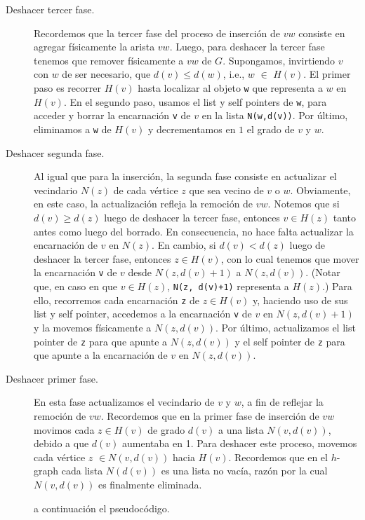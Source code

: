 \documentclass[%
    a4paper,%
    12pt,%
    twoside,%
    openright,%
    halfparskip,%
    cleardoubleempty,%
    bigheadings,%
    titlepage,%
    headsepline%
]{scrbook}
\makeatletter
\newcommand{\Code}[1]{\lstinline[basicstyle={\tt}]@#1@}
\makeatother
\begin{document}
\begin{description}
\item[Deshacer tercer fase.] Recordemos que la tercer fase del proceso de inserción de $vw$ consiste en agregar físicamente la arista $vw$.  Luego, para deshacer la tercer fase tenemos que remover físicamente a $vw$ de $G$.  Supongamos, invirtiendo $v$ con $w$ de ser necesario, que $d(v) \leq d(w)$, i.e., $w$ ${\in}$ $H(v)$.  El primer paso es recorrer $H(v)$ hasta localizar al objeto \texttt{w} que representa a $w$ en $H(v)$.  En el segundo paso, usamos el list y self pointers de \texttt{w}, para acceder y borrar la encarnación \texttt{v} de $v$ en la lista \Code{N(w,d(v))}.  Por último, eliminamos a \texttt{w} de $H(v)$ y decrementamos en $1$ el grado de $v$ y $w$.

\item[Deshacer segunda fase.] Al igual que para la inserción, la segunda fase consiste en actualizar el vecindario $N(z)$ de cada vértice $z$ que sea vecino de $v$ o $w$.  Obviamente, en este caso, la actualización refleja la remoción de $vw$.  Notemos que si $d(v) \geq d(z)$ luego de deshacer la tercer fase, entonces $v \in H(z)$ tanto antes como luego del borrado.  En consecuencia, no hace falta actualizar la encarnación de $v$ en $N(z)$.  En cambio, si $d(v) < d(z)$ luego de deshacer la tercer fase, entonces $z \in H(v)$, con lo cual tenemos que mover la encarnación \Code{v} de $v$ desde $N(z,d(v)+1)$ a $N(z, d(v))$.  (Notar que, en caso en que $v \in H(z)$, \Code{N(z, d(v)+1)} representa a $H(z)$.)  Para ello, recorremos cada encarnación \Code{z} de $z \in H(v)$ y, haciendo uso de sus list y self pointer, accedemos a la encarnación \Code{v} de $v$ en $N(z,d(v)+1)$ y la movemos físicamente a $N(z,d(v))$.  Por último, actualizamos el list pointer de \Code{z} para que apunte a $N(z,d(v))$ y el self pointer de \Code{z} para que apunte a la encarnación de $v$ en $N(z,d(v))$.

\item[Deshacer primer fase.] En esta fase actualizamos el vecindario de $v$ y $w$, a fin de reflejar la remoción de $vw$.  Recordemos que en la primer fase de inserción de $vw$ movimos cada $z \in H(v)$  de grado $d(v)$ a una lista $N(v,d(v))$, debido a que $d(v)$ aumentaba en 1. Para deshacer este proceso, movemos cada vértice $z$ $\in N(v,d(v))$  hacia $H(v)$. Recordemos que en el $h$-graph cada lista $N(d(v))$ es una lista no vacía, razón por la cual $N(v,d(v))$ es finalmente eliminada.

a continuación el pseudocódigo.
\end{description}
\end{document}
